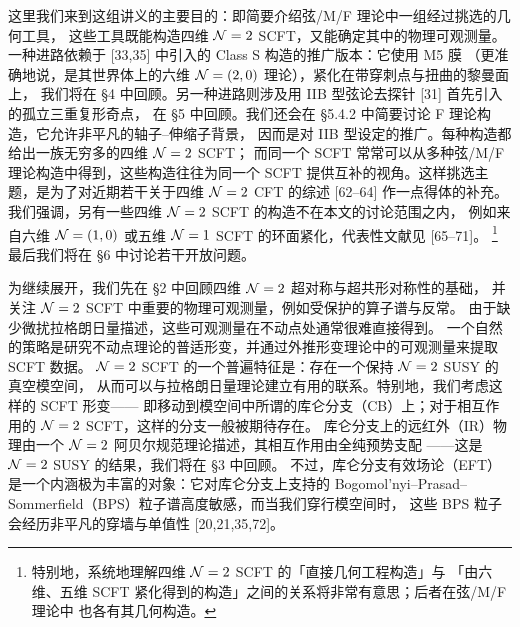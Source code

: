 这里我们来到这组讲义的主要目的：即简要介绍弦/M/F 理论中一组经过挑选的几何工具，
这些工具既能构造四维 $\mathcal{N}=2$ SCFT，又能确定其中的物理可观测量。
一种进路依赖于 [33,35] 中引入的 Class S 构造的推广版本：它使用 M5 膜
（更准确地说，是其世界体上的六维 $\mathcal{N}=(2,0)$ 理论），紧化在带穿刺点与扭曲的黎曼面上，
我们将在 §4 中回顾。另一种进路则涉及用 IIB 型弦论去探针 [31] 首先引入的孤立三重复形奇点，
在 §5 中回顾。我们还会在 §5.4.2 中简要讨论 F 理论构造，它允许非平凡的轴子--伸缩子背景，
因而是对 IIB 型设定的推广。每种构造都给出一族无穷多的四维 $\mathcal{N}=2$ SCFT；
而同一个 SCFT 常常可以从多种弦/M/F 理论构造中得到，这些构造往往为同一个 SCFT
提供互补的视角。这样挑选主题，是为了对近期若干关于四维 $\mathcal{N}=2$ CFT 的综述 [62--64]
作一点得体的补充。我们强调，另有一些四维 $\mathcal{N}=2$ SCFT 的构造不在本文的讨论范围之内，
例如来自六维 $\mathcal{N}=(1,0)$ 或五维 $\mathcal{N}=1$ SCFT 的环面紧化，代表性文献见 [65--71]。%
\footnote{特别地，系统地理解四维 $\mathcal{N}=2$ SCFT 的「直接几何工程构造」与
「由六维、五维 SCFT 紧化得到的构造」之间的关系将非常有意思；后者在弦/M/F 理论中
也各有其几何构造。}
最后我们将在 §6 中讨论若干开放问题。

为继续展开，我们先在 §2 中回顾四维 $\mathcal{N}=2$ 超对称与超共形对称性的基础，
并关注 $\mathcal{N}=2$ SCFT 中重要的物理可观测量，例如受保护的算子谱与反常。
由于缺少微扰拉格朗日量描述，这些可观测量在不动点处通常很难直接得到。
一个自然的策略是研究不动点理论的普适形变，并通过外推形变理论中的可观测量来提取 SCFT 数据。
$\mathcal{N}=2$ SCFT 的一个普遍特征是：存在一个保持 $\mathcal{N}=2$ SUSY 的真空模空间，
从而可以与拉格朗日量理论建立有用的联系。特别地，我们考虑这样的 SCFT 形变——
即移动到模空间中所谓的库仑分支（CB）上；对于相互作用的 $\mathcal{N}=2$ SCFT，这样的分支一般被期待存在。
库仑分支上的远红外（IR）物理由一个 $\mathcal{N}=2$ 阿贝尔规范理论描述，其相互作用由全纯预势支配
——这是 $\mathcal{N}=2$ SUSY 的结果，我们将在 §3 中回顾。
不过，库仑分支有效场论（EFT）是一个内涵极为丰富的对象：它对库仑分支上支持的
Bogomol'nyi--Prasad--Sommerfield（BPS）粒子谱高度敏感，而当我们穿行模空间时，
这些 BPS 粒子会经历非平凡的穿墙与单值性 [20,21,35,72]。

